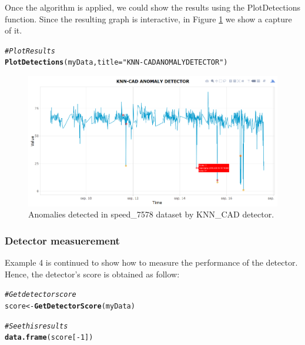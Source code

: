 \documentclass[a4paper]{article}\usepackage[]{graphicx}\usepackage[]{color}
\makeatletter
\newcommand{\hlnum}[1]{\textcolor[rgb]{0.686,0.059,0.569}{#1}}%
\newcommand{\hlstr}[1]{\textcolor[rgb]{0.192,0.494,0.8}{#1}}%
\newcommand{\hlcom}[1]{\textcolor[rgb]{0.678,0.584,0.686}{\textit{#1}}}%
\newcommand{\hlopt}[1]{\textcolor[rgb]{0,0,0}{#1}}%
\newcommand{\hlstd}[1]{\textcolor[rgb]{0.345,0.345,0.345}{#1}}%
\newcommand{\hlkwb}[1]{\textcolor[rgb]{0.69,0.353,0.396}{#1}}%
\newcommand{\hlkwc}[1]{\textcolor[rgb]{0.333,0.667,0.333}{#1}}%
\newcommand{\hlkwd}[1]{\textcolor[rgb]{0.737,0.353,0.396}{\textbf{#1}}}%
\newenvironment{kframe}{%
 \def\at@end@of@kframe{}%
 \ifinner\ifhmode%
  \def\at@end@of@kframe{\end{minipage}}%
  \begin{minipage}{\columnwidth}%
 \fi\fi%
 \def\FrameCommand##1{\hskip\@totalleftmargin \hskip-\fboxsep
 \colorbox{shadecolor}{##1}\hskip-\fboxsep
     \hskip-\linewidth \hskip-\@totalleftmargin \hskip\columnwidth}%
 \MakeFramed {\advance\hsize-\width
   \@totalleftmargin\z@ \linewidth\hsize
   \@setminipage}}%
 {\par\unskip\endMakeFramed%
 \at@end@of@kframe}
\newenvironment{knitrout}{}{} %
\makeatother
\begin{document}
\begin{itemize}
  Once the algorithm is applied, we could show the results using the PlotDetections function. Since the resulting graph is interactive, in Figure \ref{fig:Example1Score} we show a capture of it.

\begin{knitrout}
\color{fgcolor}\begin{kframe}
\begin{alltt}
\hlcom{# Plot Results}
\hlkwd{PlotDetections}\hlstd{(myData,} \hlkwc{title} \hlstd{=} \hlstr{"KNN-CAD ANOMALY DETECTOR"}\hlstd{)}
\end{alltt}
\end{kframe}
\end{knitrout}

  \begin{figure}[htbp]
  \centering
  \includegraphics[width=1\linewidth]{Example1Score.png}
  \caption{Anomalies detected in speed\_7578 dataset by KNN\_CAD detector.}
  \label{fig:Example1Score}
  \end{figure}

\end{itemize}

\subsubsection{Detector measuerement}\label{sec:examples-bloq2}

  Example 4 is continued to show how to measure the performance of the detector.
  Hence, the detector's score is obtained as follow:

\begin{knitrout}
\color{fgcolor}\begin{kframe}
\begin{alltt}
\hlcom{# Get detector score}
\hlstd{score} \hlkwb{<-} \hlkwd{GetDetectorScore}\hlstd{(myData)}

\hlcom{# See this results}
\hlkwd{data.frame}\hlstd{(score[}\hlopt{-}\hlnum{1}\hlstd{])}
\end{alltt}
\end{kframe}
\end{knitrout}
\end{document}
